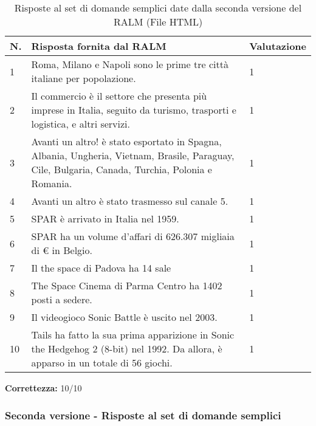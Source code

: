 \begin{table}[H]
    \centering
    \begin{tabular}{|p{0.5cm} |p{6cm} |p{2cm}|}
        \hline
        \textbf{N}. & \textbf{Risposta fornita dal RALM} & \textbf{Valutazione} \\
        \hline
        1 & Roma, Milano e Napoli sono le prime tre città italiane per popolazione. & 1 \\
        \hline
        2 & Il commercio è il settore che presenta più imprese in Italia, seguito da turismo, trasporti e logistica, e altri servizi. & 1 \\
        \hline
        3 & Avanti un altro! è stato esportato in Spagna, Albania, Ungheria, Vietnam, Brasile, Paraguay, Cile, Bulgaria, Canada, Turchia, Polonia e Romania. & 1 \\
        \hline
        4 & Avanti un altro è stato trasmesso sul canale 5. & 1 \\
        \hline
        5 & SPAR è arrivato in Italia nel 1959. & 1 \\
        \hline
        6 & SPAR ha un volume d'affari di 626.307 migliaia di € in Belgio. & 1 \\
        \hline
        7 & Il the space di Padova ha 14 sale & 1 \\
        \hline
        8 & The Space Cinema di Parma Centro ha 1402 posti a sedere. & 1 \\
        \hline
        9 & Il videogioco Sonic Battle è uscito nel 2003. & 1 \\
        \hline
        10 & Tails ha fatto la sua prima apparizione in Sonic the Hedgehog 2 (8-bit) nel 1992. Da allora, è apparso in un totale di 56 giochi. & 1 \\
        \hline
    \end{tabular}
    \caption{Risposte al set di domande semplici date dalla seconda versione del RALM (File HTML)}
\end{table}

\textbf{Correttezza:} 10/10

\subsubsection{Seconda versione - Risposte al set di domande semplici}

